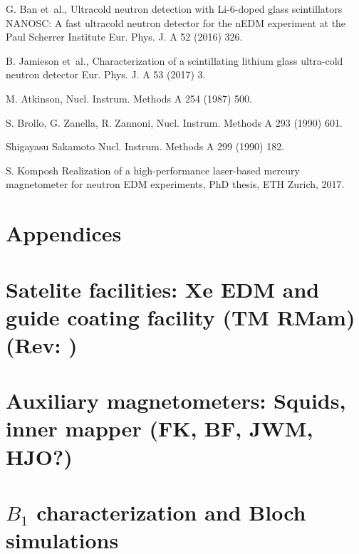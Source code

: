 \documentclass[11pt]{article}
\begin{document}
\begin{thebibliography}{9}
G. Ban et~al.,
\newblock Ultracold neutron detection with Li-6-doped glass scintillators NANOSC: A fast ultracold neutron detector for the nEDM experiment at the Paul Scherrer Institute
\newblock Eur. Phys. J. A 52 (2016) 326.

B. Jamieson et~al.,
\newblock Characterization of a scintillating lithium glass ultra-cold neutron detector
\newblock Eur. Phys. J. A 53 (2017) 3.

M. Atkinson,
\newblock Nucl. Instrum. Methods A 254 (1987) 500. 

S. Brollo, G. Zanella, R. Zannoni,
\newblock Nucl. Instrum. Methods A 293 (1990) 601.

Shigayasu Sakamoto 
\newblock Nucl. Instrum. Methods A 299 (1990) 182.

S. Komposh
\newblock Realization of a high-performance laser-based mercury magnetometer for neutron EDM experiments,
\newblock PhD thesis, ETH Zurich, 2017.

\end{thebibliography}

\clearpage
\section{Appendices}
%


\section{Satelite facilities: Xe EDM and guide coating facility {\color{red}(TM RMam)} {\color{darkgreen}(Rev: )}} 
\label{sec:satellite}



\clearpage
\section{Auxiliary magnetometers: Squids, inner mapper {\color{red}(FK, BF, JWM, HJO?)}}
\label{sec:auxmag}



\clearpage
\section{$B_1$ characterization and Bloch simulations}
\label{sec:B1Bloch}


\clearpage

 
\end{document}
